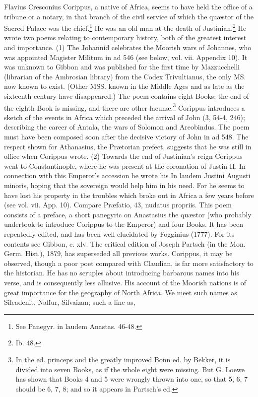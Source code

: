 Flavius Cresconius Corippus, a native of Africa, seems to have held the office of a tribune or a notary, in that branch of the civil service of which the quæstor of the Sacred Palace was the chief.\footnote{See Panegyr. in laudem Anastas. 46-48.} He was an old man at the death of Justinian.\footnote{Ib. 48.} He wrote two poems relating to contemporary history, both of the greatest interest and importance. (1) The Johannid celebrates the Moorish wars of Johannes, who was appointed Magister Militum in ad 546 (see below, vol. vii. Appendix 10). It was unknown to Gibbon and was published for the first time by Mazzucchelli (librarian of the Ambrosian library) from the Codex Trivultianus, the only MS. now known to exist. (Other MSS. known in the Middle Ages and as late as the sixteenth century have disappeared.) The poem contains eight Books; the end of the eighth Book is missing, and there are other lacunæ.\footnote{In the ed. princeps and the greatly improved Bonn ed. by Bekker, it is divided into seven Books, as if the whole eight were missing. But G. Loewe has shown that Books 4 and 5 were wrongly thrown into one, so that 5, 6, 7 should be 6, 7, 8; and so it appears in Partsch\texthebrew{}’s ed.} Corippus introduces a sketch of the events in Africa which preceded the arrival of John (3, 54-4, 246); describing the career of Antala, the wars of Solomon and Areobindus. The poem must have been composed soon after the decisive victory of John in ad 548. The respect shown for Athanasius, the Prætorian prefect, suggests that he was still in office when Corippus wrote. (2) Towards the end of Justinian\texthebrew{}’s reign Corippus went to Constantinople, where he was present at the coronation of Justin II. In connection with this Emperor\texthebrew{}’s accession he wrote his In laudem Justini Augusti minoris, hoping that the sovereign would help him in his need. For he seems to have lost his property in the troubles which broke out in Africa a few years before (see vol. vii. App. 10). Compare Præfatio, 43, nudatus propriis. This poem consists of a preface, a short panegyric on Anastasius the quæstor (who probably undertook to introduce Corippus to the Emperor) and four Books. It has been repeatedly edited, and has been well elucidated by Fogginius (1777). For its contents see Gibbon, c. xlv. The critical edition of Joseph Partsch (in the Mon. Germ. Hist.), 1879, has superseded all previous works. Corippus, it may be observed, though a poor poet compared with Claudian, is far more satisfactory to the historian. He has no scruples about introducing barbarous names into his verse, and is consequently less allusive. His account of the Moorish nations is of great importance for the geography of North Africa. We meet such names as Silcadenit, Naffur, Silvaizan; such a line as,

